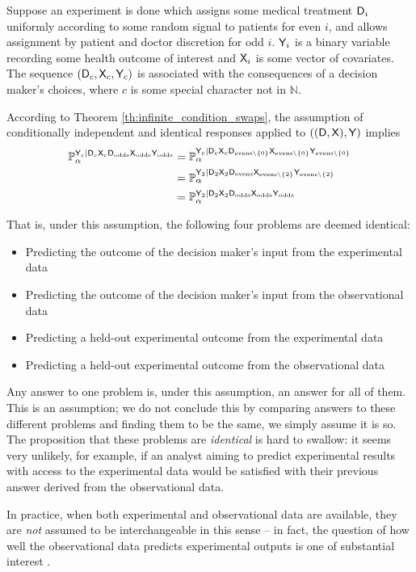 \begin{example}\label{ex:no_infinite_swapping}
Suppose an experiment is done which assigns some medical treatment $\mathsf{D}_i$ uniformly according to some random signal to patients for even $i$, and allows assignment by patient and doctor discretion for odd $i$. $\mathsf{Y}_i$ is a binary variable recording some health outcome of interest and $\mathsf{X}_i$ is some vector of covariates. The sequence $(\mathsf{D}_c,\mathsf{X}_c,\mathsf{Y}_c)$ is associated with the consequences of a decision maker's choices, where $c$ is some special character not in $\mathbb{N}$.

According to Theorem \ref{th:infinite_condition_swaps}, the assumption of conditionally independent and identical responses applied to $((\mathsf{D},\mathsf{X}),\mathsf{Y})$ implies
\begin{align}
    \mathbb{P}_\alpha^{\mathsf{Y}_c|\mathsf{D}_c\mathsf{X}_c\mathsf{D}_{\text{odds}}\mathsf{X}_{\text{odds}}\mathsf{Y}_{\text{odds}}}&=\mathbb{P}_\alpha^{\mathsf{Y}_c|\mathsf{D}_c\mathsf{X}_c\mathsf{D}_{\text{evens}\setminus\{0\}}\mathsf{X}_{\text{evens}\setminus\{0\}}\mathsf{Y}_{\text{evens}\setminus\{0\}}}\\
    &=\mathbb{P}_\alpha^{\mathsf{Y}_2|\mathsf{D}_2\mathsf{X}_2\mathsf{D}_{\text{evens}}\mathsf{X}_{\text{evens}\setminus\{2\}}\mathsf{Y}_{\text{evens}\setminus\{2\}}}\\
    &=\mathbb{P}_\alpha^{\mathsf{Y}_2|\mathsf{D}_2\mathsf{X}_2\mathsf{D}_{\text{odds}}\mathsf{X}_{\text{odds}}\mathsf{Y}_{\text{odds}}}
\end{align}

That is, under this assumption, the following four problems are deemed identical:
\begin{itemize}
    \item Predicting the outcome of the decision maker's input from the experimental data
    \item Predicting the outcome of the decision maker's input from the observational data
    \item Predicting a held-out experimental outcome from the experimental data
    \item Predicting a held-out experimental outcome from the observational data
\end{itemize}
Any answer to one problem is, under this assumption, an answer for all of them. This is an assumption; we do not conclude this by comparing answers to these different problems and finding them to be the same, we simply assume it is so. The proposition that these problems are \emph{identical} is hard to swallow: it seems very unlikely, for example, if an analyst aiming to predict experimental results with access to the experimental data would be satisfied with their previous answer derived from the observational data.
\end{example}

In practice, when both experimental and observational data are available, they are \emph{not} assumed to be interchangeable in this sense -- in fact, the question of how well the observational data predicts experimental outputs is one of substantial interest \citet{eckles_bias_2021,gordon_comparison_2018,gordon_close_2022}.

